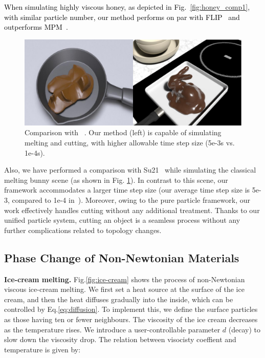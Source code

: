 \documentclass[10pt,journal,compsoc]{IEEEtran}
\newcommand{\revised}[1]{{\textcolor{black}{#1}}}
\begin{document}
\revised{When simulating highly viscous honey, as depicted in Fig.~\ref{fig:honey_comp1}, with similar particle number, our method performs on par with FLIP~\cite{Shao-Huang2022-unsmoothed} and outperforms MPM~\cite{Fang2019-sillyRubber}.}

\begin{figure}[htbp]
	\centering
	\includegraphics[width=0.9\linewidth]{pics/comp-melting-bunny.pdf}
	\caption{Comparison with ~\cite{Su2021}. Our method (left) is capable of simulating melting and cutting, with higher allowable time step size (5e-3s vs. 1e-4s). }     \label{fig:comp-melting-bunny1}
\end{figure}


Also, we have performed a comparison with Su21~\cite{Su2021} while simulating the classical melting bunny scene (as shown in Fig. \ref{fig:comp-melting-bunny1}). In contrast to this scene, our framework accommodates a larger time step size (our average time step size is 5e-3, compared to 1e-4 in~\cite{Su2021}). Moreover, owing to the pure particle framework, our work effectively handles cutting without any additional treatment.  Thanks to our unified particle system, cutting an object is a seamless process without any further complications related to topology changes.

\subsection{Phase Change of Non-Newtonian Materials}

\textbf{Ice-cream melting.}
Fig.\ref{fig:ice-cream} shows the process of non-Newtonian viscous ice-cream melting. We first set a heat source at the surface of the ice cream, and then the heat diffuses gradually into the inside, which can be controlled by Eq.\ref{eq:diffusion}. To implement this, we define the surface particles as those having ten or fewer neighbours. The viscosity of the ice cream decreases as the temperature rises. We introduce a user-controllable parameter $d$ (decay) to slow down the viscosity drop. The relation between visocisty coeffient and temperature is given by:
\end{document}
